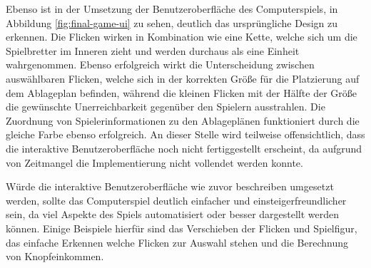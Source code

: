 Ebenso ist in der Umsetzung der Benutzeroberfläche des Computerspiels, in Abbildung \ref{fig:final-game-ui} zu sehen, deutlich das ursprüngliche Design zu erkennen. Die Flicken wirken in Kombination wie eine Kette, welche sich um die Spielbretter im Inneren zieht und werden durchaus als eine Einheit wahrgenommen. Ebenso erfolgreich wirkt die Unterscheidung zwischen auswählbaren Flicken, welche sich in der korrekten Größe für die Platzierung auf dem Ablageplan befinden, während die kleinen Flicken mit der Hälfte der Größe die gewünschte Unerreichbarkeit gegenüber den Spielern ausstrahlen. Die Zuordnung von Spielerinformationen zu den Ablageplänen funktioniert durch die gleiche Farbe ebenso erfolgreich. An dieser Stelle wird teilweise offensichtlich, dass die interaktive Benutzeroberfläche noch nicht fertiggestellt erscheint, da aufgrund von Zeitmangel die Implementierung nicht vollendet werden konnte.

Würde die interaktive Benutzeroberfläche wie zuvor beschreiben umgesetzt werden, sollte das Computerspiel deutlich einfacher und einsteigerfreundlicher sein, da viel Aspekte des Spiels automatisiert oder besser dargestellt werden können. Einige Beispiele hierfür sind das Verschieben der Flicken und Spielfigur, das einfache Erkennen welche Flicken zur Auswahl stehen und die Berechnung von Knopfeinkommen.